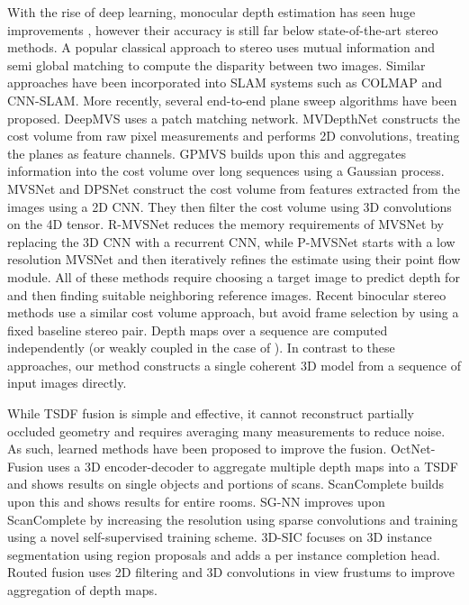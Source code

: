 \documentclass[runningheads]{llncs}
\begin{document}
With the rise of deep learning, monocular depth estimation has seen huge improvements \cite{lasinger2019towards, lee2019big, fu2018deep},
however their accuracy is still far below state-of-the-art stereo methods.
A popular classical approach to stereo \cite{hirschmuller2007stereo} uses mutual information and semi global matching to compute the disparity between two images. Similar approaches have been incorporated into SLAM systems such as COLMAP \cite{schoenberger2016mvs, schoenberger2016sfm} and CNN-SLAM\cite {tateno2017cnn}.
More recently, several end-to-end plane sweep algorithms have been proposed.
DeepMVS\cite{huang2018deepmvs} uses a patch matching network.
MVDepthNet\cite{wang2018mvdepthnet} constructs the cost volume from raw pixel measurements and performs 2D convolutions,
treating the planes as feature channels.
GPMVS\cite{hou2019multi} builds upon this and aggregates information into the cost volume over long sequences using a Gaussian process.
MVSNet\cite{yao2018mvsnet} and DPSNet\cite{im2019dpsnet} construct the cost volume from features extracted from the images using a 2D CNN. They then filter the cost volume using 3D convolutions on the 4D tensor.
R-MVSNet\cite{yao2019recurrent} reduces the memory requirements of MVSNet by replacing the 3D CNN with a recurrent CNN, while P-MVSNet\cite{chen2019point} starts with a low resolution MVSNet and then iteratively refines the estimate using their point flow module.
All of these methods require choosing a target image to predict depth for and then finding suitable neighboring reference images.
Recent binocular stereo methods \cite{chang2018pyramid, chabra2019stereodrnet} use a similar cost volume approach,
but avoid frame selection by using a fixed baseline stereo pair.
Depth maps over a sequence are computed independently (or weakly coupled in the case of \cite{hou2019multi}).
In contrast to these approaches, our method constructs a single coherent 3D model from a sequence of input images directly.

While TSDF fusion is simple and effective, it cannot reconstruct partially occluded geometry and requires averaging many measurements to reduce noise.
As such, learned methods have been proposed to improve the fusion.
OctNet-Fusion\cite{riegler2017octnet} uses a 3D encoder-decoder to aggregate multiple depth maps into a TSDF and shows results on single objects and portions of scans.
ScanComplete\cite{dai2018scancomplete} builds upon this and shows results for entire rooms.
SG-NN\cite{dai2019sg} improves upon ScanComplete by increasing the resolution using sparse convolutions\cite{graham20183d} and training using a novel self-supervised training scheme.
3D-SIC\cite{hou20193d} focuses on 3D instance segmentation using region proposals and adds a per instance completion head.
Routed fusion\cite{weder2020routedfusion} uses 2D filtering and 3D convolutions in view frustums to improve aggregation of depth maps.
\end{document}
